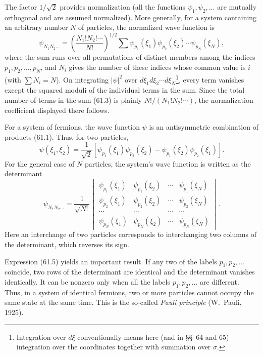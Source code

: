 The factor $1/\sqrt2$ provides normalization (all the functions $\psi_1,\psi_2,\ldots$ are mutually orthogonal and are assumed normalized). More generally, for a system containing an arbitrary number $N$ of particles, the normalized wave function is
\begin{equation}
 \psi_{N_1N_2\ldots}=\left(\frac{N_1!N_2!\cdots}{N!}\right)^{1/2}
 \sum \psi_{p_1}(\xi_1)\psi_{p_2}(\xi_2)\cdots\psi_{p_N}(\xi_N),
 \tag{61.3}
\end{equation}
where the sum runs over all permutations of distinct members among the indices $p_1,p_2,\ldots,p_N$, and $N_i$ gives the number of these indices whose common value is $i$ (with $\sum N_i=N$). On integrating $|\psi|^2$ over $d\xi_1d\xi_2\cdots d\xi_N$\footnote{Integration over $d\xi$ conventionally means here (and in §§~64 and 65) integration over the coordinates together with summation over $\sigma$.}, every term vanishes except the squared moduli of the individual terms in the sum. Since the total number of terms in the sum (61.3) is plainly $N!/(N_1!N_2!\cdots)$, the normalization coefficient displayed there follows.

For a system of fermions, the wave function $\psi$ is an antisymmetric combination of products (61.1). Thus, for two particles,
\begin{equation}
 \psi(\xi_1,\xi_2)=\frac1{\sqrt2}\left[\psi_{p_1}(\xi_1)\psi_{p_2}(\xi_2)-\psi_{p_1}(\xi_2)\psi_{p_2}(\xi_1)\right].
 \tag{61.4}
\end{equation}
For the general case of $N$ particles, the system's wave function is written as the determinant
\begin{equation}
 \psi_{N_1N_2\ldots}=\frac1{\sqrt{N!}}
 \begin{vmatrix}
  \psi_{p_1}(\xi_1)&\psi_{p_1}(\xi_2)&\cdots&\psi_{p_1}(\xi_N)\\
  \psi_{p_2}(\xi_1)&\psi_{p_2}(\xi_2)&\cdots&\psi_{p_2}(\xi_N)\\
  \cdots&\cdots&\cdots&\cdots\\
  \psi_{p_N}(\xi_1)&\psi_{p_N}(\xi_2)&\cdots&\psi_{p_N}(\xi_N)
 \end{vmatrix}.
 \tag{61.5}
\end{equation}
Here an interchange of two particles corresponds to interchanging two columns of the determinant, which reverses its sign.

Expression (61.5) yields an important result. If any two of the labels $p_1,p_2,\ldots$ coincide, two rows of the determinant are identical and the determinant vanishes identically. It can be nonzero only when all the labels $p_1,p_2,\ldots$ are different. Thus, in a system of identical fermions, two or more particles cannot occupy the same state at the same time. This is the so-called \emph{Pauli principle} (W.~Pauli, 1925).
